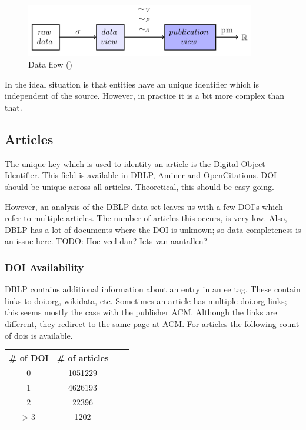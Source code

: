\documentclass{ou-report}
\newcommand{\todo}[1]{{\color{red} TODO: #1}}
\begin{document}
\begin{figure}[H]
    \centering
    \includegraphics[width=10cm]{images/data_to_publication_metrics_jm2017.png}
    \caption{Data flow (\cite{JM2017})}
    \label{fig:dataflow_jm2017_2}
\end{figure}

In the ideal situation is that entities have an unique identifier which is 
independent of the source. However, in practice it is a bit more complex than 
that.

\subsection{Articles}
The unique key which is used to identity an article is the Digital Object 
Identifier. This field is available in DBLP, Aminer and OpenCitations. DOI 
should be unique across all articles. Theoretical, this should be easy going.

However, an analysis of the DBLP data set leaves us with a few DOI's which refer
to multiple articles. The number of articles this occurs, is very low. Also, DBLP 
has a lot of documents where the DOI is unknown; so data completeness 
is an issue here. \todo{Hoe veel dan? Iets van aantallen?}

\subsubsection{DOI Availability}
DBLP contains additional information about an entry in an ee tag. These contain 
links to doi.org, wikidata, etc. Sometimes an article has multiple doi.org links; 
this seems mostly the case with the publisher ACM. Although the links are 
different, they redirect to the same page at ACM.
For articles the following count of dois is available.
\begin{center}
    \begin{tabular}{ |c|c|c|c| }
        \hline
        \# of DOI & \# of articles \\
        \hline
        0 & 1051229 \\
        1 & 4626193 \\
        2 & 22396 \\
        > 3 & 1202 \\
        \hline
    \end{tabular}
\end{center}
\end{document}
